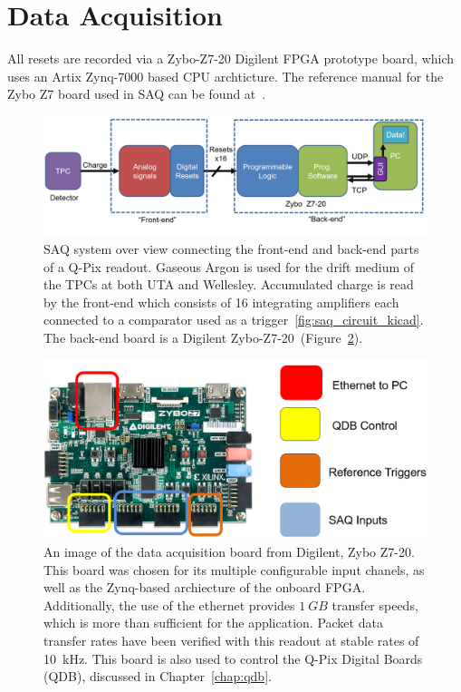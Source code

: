 \section{Data Acquisition}

All resets are recorded via a Zybo-Z7-20 Digilent FPGA prototype board, which uses an Artix Zynq-7000 based CPU archticture.
The reference manual for the Zybo Z7 board used in SAQ can be found at~\citep{zybo_zy_reference}.

\begin{figure}[]
\centering
\includegraphics[width=\textwidth]{images/saq_daq_back-end_summary.png}
\caption{SAQ system over view connecting the front-end and back-end parts of a Q-Pix readout.
Gaseous Argon is used for the drift medium of the TPCs at both UTA and Wellesley.
Accumulated charge is read by the front-end which consists of 16 integrating amplifiers each connected to a comparator used as a trigger~\ref{fig:saq_circuit_kicad}.
The back-end board is a Digilent Zybo-Z7-20~(Figure~\ref{fig:saq_zybo}).
}
\label{fig:saq_diagram}
\end{figure}

\begin{figure}[]
\centering
\includegraphics[width=\textwidth]{images/saq_zybo_io_summary.png}
\caption{An image of the data acquisition board from Digilent, Zybo Z7-20. 
This board was chosen for its multiple configurable input chanels, as well as the Zynq-based archiecture of the onboard FPGA.
Additionally, the use of the ethernet provides $1~\unit{GB}$ transfer speeds, which is more than sufficient for the application.
Packet data transfer rates have been verified with this readout at stable rates of 10~\unit{kHz}.
This board is also used to control the Q-Pix Digital Boards (QDB), discussed in Chapter~\ref{chap:qdb}.
}
\label{fig:saq_zybo}
\end{figure}

